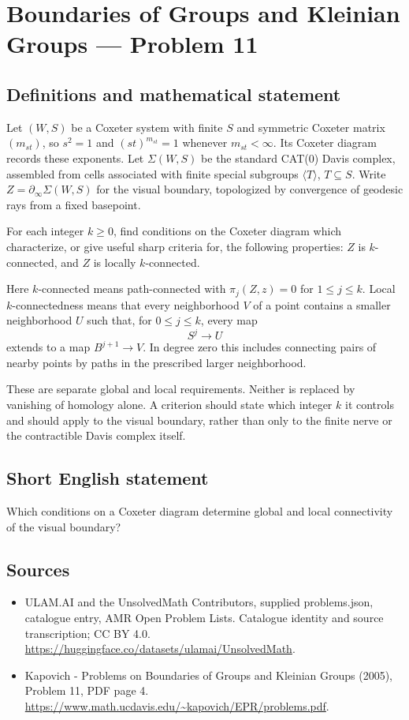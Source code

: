 \documentclass[11pt,a4paper]{article}
\begin{document}
\section*{Boundaries of Groups and Kleinian Groups — Problem 11}\label{statement}

\subsection{Definitions and mathematical statement}
Let $(W,S)$ be a Coxeter system with finite $S$ and symmetric Coxeter matrix $(m_{st})$, so $s^2=1$ and $(st)^{m_{st}}=1$ whenever $m_{st}<\infty$. Its Coxeter diagram records these exponents. Let $\Sigma(W,S)$ be the standard CAT(0) Davis complex, assembled from cells associated with finite special subgroups $\langle T\rangle$, $T\subseteq S$. Write $Z=\partial_\infty\Sigma(W,S)$ for the visual boundary, topologized by convergence of geodesic rays from a fixed basepoint.

For each integer $k\geq0$, find conditions on the Coxeter diagram which characterize, or give useful sharp criteria for, the following properties: $Z$ is $k$-connected, and $Z$ is locally $k$-connected.

Here $k$-connected means path-connected with $\pi_j(Z,z)=0$ for $1\leq j\leq k$. Local $k$-connectedness means that every neighborhood $V$ of a point contains a smaller neighborhood $U$ such that, for $0\leq j\leq k$, every map
\[
 S^j\longrightarrow U
\]
extends to a map $B^{j+1}\to V$. In degree zero this includes connecting pairs of nearby points by paths in the prescribed larger neighborhood.

These are separate global and local requirements. Neither is replaced by vanishing of homology alone. A criterion should state which integer $k$ it controls and should apply to the visual boundary, rather than only to the finite nerve or the contractible Davis complex itself.
\subsection{Short English statement}
Which conditions on a Coxeter diagram determine global and local connectivity of the visual boundary?
\subsection{Sources}
\begin{itemize}
\item[S1] ULAM.AI and the UnsolvedMath Contributors, supplied problems.json, catalogue entry, AMR Open Problem Lists. Catalogue identity and source transcription; CC BY 4.0.
\url{https://huggingface.co/datasets/ulamai/UnsolvedMath}.
\item[S2] Kapovich - Problems on Boundaries of Groups and Kleinian Groups (2005), Problem 11, PDF page 4. 
\url{https://www.math.ucdavis.edu/~kapovich/EPR/problems.pdf}.
\end{itemize}
\end{document}
